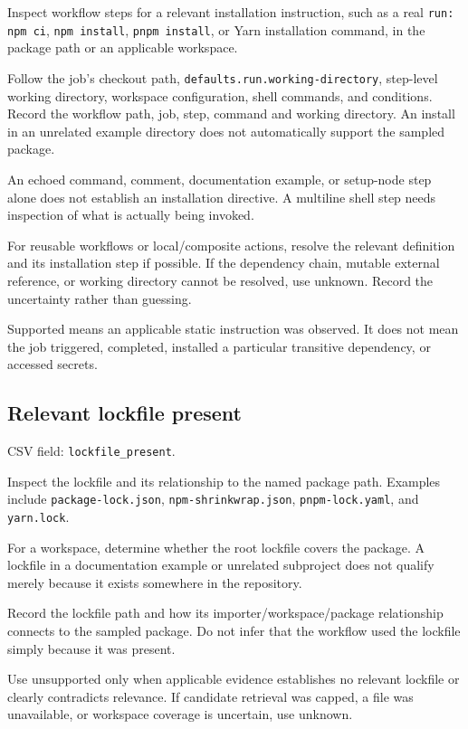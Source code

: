 \documentclass[11pt,a4paper]{article}
\begin{document}
Inspect workflow steps for a relevant installation instruction, such as a real \nolinkurl{run: npm ci}, \nolinkurl{npm install}, \nolinkurl{pnpm install}, or Yarn installation command, in the package path or an applicable workspace.


Follow the job's checkout path, \nolinkurl{defaults.run.working-directory}, step-level working directory, workspace configuration, shell commands, and conditions. Record the workflow path, job, step, command and working directory. An install in an unrelated example directory does not automatically support the sampled package.


An echoed command, comment, documentation example, or setup-node step alone does not establish an installation directive. A multiline shell step needs inspection of what is actually being invoked.


For reusable workflows or local/composite actions, resolve the relevant definition and its installation step if possible. If the dependency chain, mutable external reference, or working directory cannot be resolved, use unknown. Record the uncertainty rather than guessing.


Supported means an applicable static instruction was observed. It does not mean the job triggered, completed, installed a particular transitive dependency, or accessed secrets.


\subsection{Relevant lockfile present}


CSV field: \nolinkurl{lockfile_present}.


Inspect the lockfile and its relationship to the named package path. Examples include \nolinkurl{package-lock.json}, \nolinkurl{npm-shrinkwrap.json}, \nolinkurl{pnpm-lock.yaml}, and \nolinkurl{yarn.lock}.


For a workspace, determine whether the root lockfile covers the package. A lockfile in a documentation example or unrelated subproject does not qualify merely because it exists somewhere in the repository.


Record the lockfile path and how its importer/workspace/package relationship connects to the sampled package. Do not infer that the workflow used the lockfile simply because it was present.


Use unsupported only when applicable evidence establishes no relevant lockfile or clearly contradicts relevance. If candidate retrieval was capped, a file was unavailable, or workspace coverage is uncertain, use unknown.
\end{document}
